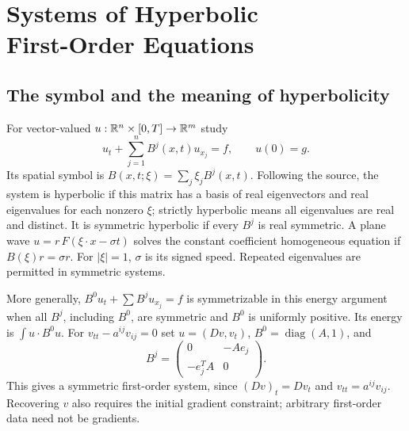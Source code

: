 \Needspace{55mm}
\section[Systems of Hyperbolic First-Order Equations]{Systems of Hyperbolic\\First-Order Equations}
\label{sec:7-3}
\Needspace{55mm}
\subsection{The symbol and the meaning of hyperbolicity}
For vector-valued $u:\mathbb{R}^n\times[0,T]\to\mathbb{R}^m$ study
\begin{equation}\label{eq:7-system}
 u_t+\sum_{j=1}^n B^j(x,t)u_{x_j}=f,\qquad u(0)=g.
\end{equation}
Its spatial symbol is $B(x,t;\xi)=\sum_j\xi_jB^j(x,t)$.
Following the source, the system is hyperbolic if this matrix has a basis
of real eigenvectors and real eigenvalues for each nonzero $\xi$;
strictly hyperbolic means all eigenvalues are real and distinct.
It is symmetric hyperbolic if every $B^j$ is real symmetric.
A plane wave $u=r\,F(\xi\cdot x-\sigma t)$ solves the constant coefficient
homogeneous equation if $B(\xi)r=\sigma r$. For $|\xi|=1$, $\sigma$ is
its signed speed. Repeated eigenvalues are permitted in symmetric systems.
\Needspace{55mm}

More generally, $B^0u_t+\sum B^ju_{x_j}=f$ is symmetrizable in this
energy argument when all $B^j$, including $B^0$, are symmetric and
$B^0$ is uniformly positive. Its energy is $\int u\cdot B^0u$.
For $v_{tt}-a^{ij}v_{ij}=0$ set $u=(Dv,v_t)$,
$B^0=\operatorname{diag}(A,1)$, and
\[
 B^j=\begin{pmatrix}0&-Ae_j\\-e_j^TA&0\end{pmatrix}.
\]
This gives a symmetric first-order system, since
$(Dv)_t=Dv_t$ and $v_{tt}=a^{ij}v_{ij}$.
Recovering $v$ also requires the initial gradient constraint; arbitrary
first-order data need not be gradients.

\Needspace{55mm}
